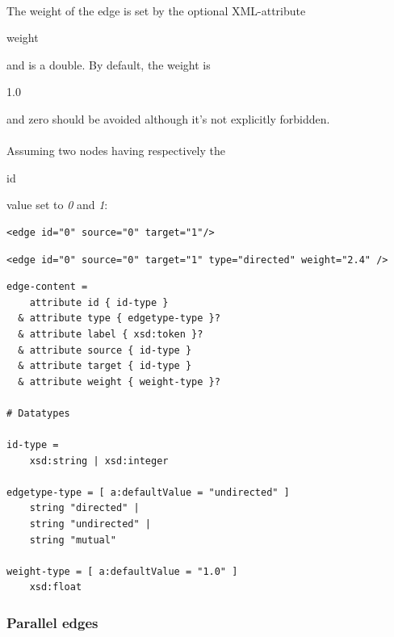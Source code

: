 \documentclass[a4paper,10pt]{article}
\begin{document}
\paragraph{}
The weight of the edge is set by the optional XML-attribute \begin{footnotesize}weight\end{footnotesize} and is a double. By default, the weight is \begin{footnotesize}1.0\end{footnotesize} and zero should be avoided although it's not explicitly forbidden.

\paragraph{}
Assuming two nodes having respectively the \begin{footnotesize}id\end{footnotesize} value set to \textit{0} and \textit{1}:

\lstset{ style=gexf }
\begin{lstlisting}[caption={An edge!},label=anEdge]
<edge id="0" source="0" target="1"/>
\end{lstlisting}

\lstset{ style=gexf }
\begin{lstlisting}[caption={A more complete edge},label=aMoreEdge]
<edge id="0" source="0" target="1" type="directed" weight="2.4" />
\end{lstlisting}

\lstset{ style=rnc }
\begin{lstlisting}[caption={Edge Specification},label=edgeRNC]
edge-content =
    attribute id { id-type }
  & attribute type { edgetype-type }?
  & attribute label { xsd:token }?
  & attribute source { id-type }
  & attribute target { id-type }
  & attribute weight { weight-type }?

# Datatypes

id-type =
    xsd:string | xsd:integer

edgetype-type = [ a:defaultValue = "undirected" ]
    string "directed" |
    string "undirected" |
    string "mutual"

weight-type = [ a:defaultValue = "1.0" ]
    xsd:float
\end{lstlisting}

\subsubsection{Parallel edges}
\end{document}
